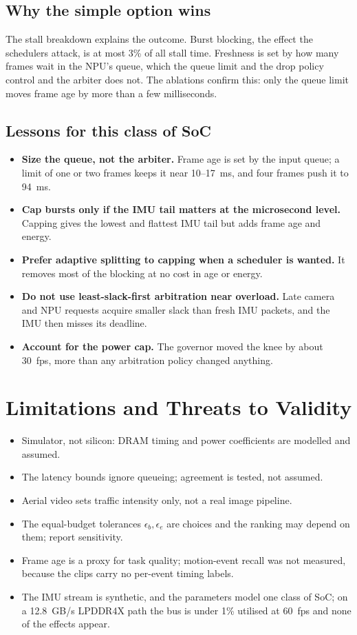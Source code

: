 \documentclass[11pt,a4paper]{article}
\begin{document}
\subsection{Why the simple option wins}
The stall breakdown explains the outcome. Burst blocking, the effect the schedulers attack, is at most 3\% of all stall time. Freshness is set by how many frames wait in the NPU's queue, which the queue limit and the drop policy control and the arbiter does not. The ablations confirm this: only the queue limit moves frame age by more than a few milliseconds.

\subsection{Lessons for this class of SoC}
\begin{itemize}
\item \textbf{Size the queue, not the arbiter.} Frame age is set by the input queue; a limit of one or two frames keeps it near 10--17~ms, and four frames push it to 94~ms.
\item \textbf{Cap bursts only if the IMU tail matters at the microsecond level.} Capping gives the lowest and flattest IMU tail but adds frame age and energy.
\item \textbf{Prefer adaptive splitting to capping when a scheduler is wanted.} It removes most of the blocking at no cost in age or energy.
\item \textbf{Do not use least-slack-first arbitration near overload.} Late camera and NPU requests acquire smaller slack than fresh IMU packets, and the IMU then misses its deadline.
\item \textbf{Account for the power cap.} The governor moved the knee by about 30~fps, more than any arbitration policy changed anything.
\end{itemize}

\section{Limitations and Threats to Validity}\label{sec:limits}
\begin{itemize}
\item Simulator, not silicon: DRAM timing and power coefficients are modelled and assumed.
\item The latency bounds ignore queueing; agreement is tested, not assumed.
\item Aerial video sets traffic intensity only, not a real image pipeline.
\item The equal-budget tolerances $\epsilon_b,\epsilon_e$ are choices and the ranking may depend on them; report sensitivity.
\item Frame age is a proxy for task quality; motion-event recall was not measured, because the clips carry no per-event timing labels.
\item The IMU stream is synthetic, and the parameters model one class of SoC; on a 12.8~GB/s LPDDR4X path the bus is under 1\% utilised at 60~fps and none of the effects appear.
\end{itemize}
\end{document}
